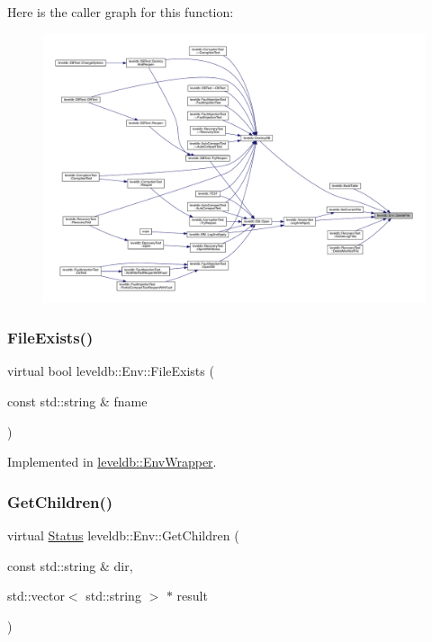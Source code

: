 Here is the caller graph for this function\+:
\nopagebreak
\begin{figure}[H]
\begin{center}
\leavevmode
\includegraphics[width=350pt]{classleveldb_1_1_env_ac956b984466d5f09309664177687f9af_icgraph}
\end{center}
\end{figure}
\mbox{\label{classleveldb_1_1_env_acbb85047fdf7bf441bd365cfb09f9ecb}} 
\subsubsection{\texorpdfstring{FileExists()}{FileExists()}}
{\footnotesize\ttfamily virtual bool leveldb\+::\+Env\+::\+File\+Exists (\begin{DoxyParamCaption}\item[{const std\+::string \&}]{fname }\end{DoxyParamCaption})\hspace{0.3cm}{\ttfamily [pure virtual]}}



Implemented in \mbox{\hyperlink{classleveldb_1_1_env_wrapper_ae046fc226c039a8eb5d00c59eb0f47ba}{leveldb\+::\+Env\+Wrapper}}.

\mbox{\label{classleveldb_1_1_env_a53028e3112d7bb3bf6574ddaab18d6f6}} 
\subsubsection{\texorpdfstring{GetChildren()}{GetChildren()}}
{\footnotesize\ttfamily virtual \mbox{\hyperlink{classleveldb_1_1_status}{Status}} leveldb\+::\+Env\+::\+Get\+Children (\begin{DoxyParamCaption}\item[{const std\+::string \&}]{dir,  }\item[{std\+::vector$<$ std\+::string $>$ $\ast$}]{result }\end{DoxyParamCaption})\hspace{0.3cm}{\ttfamily [pure virtual]}}



